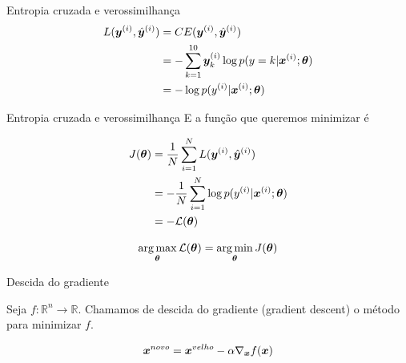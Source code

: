 \documentclass[10pt]{beamer}
\begin{document}
\begin{frame}[fragile]{Entropia cruzada e verossimilhança}
\Large{
\begin{align*}
L(\bm{y}^{(i)}, {\hat{\bm{y}}}^{(i)}) &= CE(\bm{y}^{(i)}, {\hat{\bm{y}}}^{(i)})\\
&= -\sum_{k=1}^{10} \bm{y}^{(i)}_{k}\log p(y=k| \bm{x}^{(i)}; \bm{\theta})\\
&= - \log p(y^{(i)}| \bm{x}^{(i)}; \bm{\theta})\\
\end{align*}
}
\end{frame}

\begin{frame}{Entropia cruzada e verossimilhança}
E a função que queremos minimizar é
\Large{
\begin{align*}
J(\bm{\theta}) &= \frac{1}{N}\sum_{i=1}^{N} L(\bm{y}^{(i)}, {\hat{\bm{y}}}^{(i)})\\
&= - \frac{1}{N}\sum_{i=1}^{N}\log p(y^{(i)}| \bm{x}^{(i)}; \bm{\theta})\\
&= - \mathcal{L}(\bm{\theta})
\end{align*}

\vspace{0.2cm}
\begin{equation*}
\operatorname*{arg\,max}_{\bm{\theta}} \mathcal{L}(\bm{\theta}) =  \operatorname*{arg\,min}_{\bm{\theta}} J(\bm{\theta})
\end{equation*}
}
\end{frame}



\begin{frame}{Descida do gradiente}
\Large{
Seja $f:\mathbb{R}^{n} \rightarrow\mathbb{R}$. Chamamos de descida do gradiente (\alert{gradient descent}) o método para minimizar $f$. 

\vspace{0.3cm}

\begin{equation*}
\bm{x}^{novo} = \bm{x}^{velho} - \alpha \nabla_{\bm{x}} {f(\bm{x})}
\end{equation*}
\vspace{0.3cm}
}
\end{frame}
\end{document}
